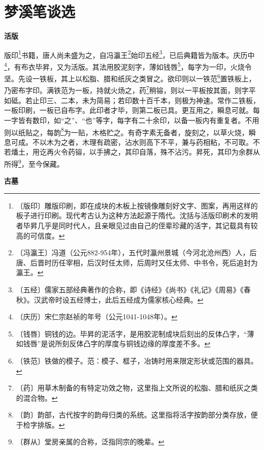 \documentclass[12pt,UTF-8,openany,a4]{ctexbook}
\begin{document}
\chapter{梦溪笔谈选}

\begin{large}
    
    \begin{center}{\Large\textbf{活版}}\end{center}
    
    版印\footnote{〔版印〕\yiwen 雕版印刷，即在成块的木板上按镜像雕刻好文字、图案，再用这样的板子进行印刷。现代考古认为这种方法起源于隋代。沈括与活版印刷术的发明者毕昇几乎是同时代人，且亲眼见过由自己的侄辈珍藏的活字，其记载具有较高的可信度。}书籍，唐人尚未盛为之，自冯瀛王\footnote{〔冯瀛王〕\yiwen 冯道（公元882-954年），五代时瀛州景城（今河北沧州西）人，后唐、后晋时历任宰相，后汉时任太师，后周时又任太师、中书令，死后追封为瀛王。}始印五经\footnote{〔五经〕\yiwen 儒家五部经典著作的合称，即《诗经》《尚书》《礼记》《周易》《春秋》。汉武帝时设五经博士，此后五经成为儒家核心经典。}，已后典籍皆为版本。庆历中\footnote{〔庆历〕\yiwen 宋仁宗赵祯的年号（公元1041-1048年）。}，有布衣毕昇，又为活版。其法用胶泥刻字，薄如钱唇\footnote{〔钱唇〕\yiwen 铜钱的边。毕昇的泥活字，是用胶泥制成块后刻出的反体凸字，“薄如钱唇”是说所刻反体凸字的厚度与铜钱边缘的厚度差不多。}，每字为一印，火烧令坚。先设一铁板，其上以松脂、腊和纸灰之类冒之。欲印则以一铁范\footnote{〔铁范〕\yiwen 铁做的模子。范：模子、框子，冶铸时用来限定形状或范围的器具。}置铁板上，乃密布字印。满铁范为一板，持就火炀之，药\footnote{〔药〕\yiwen 用草木制备的有特定功效之物，这里指上文所说的松脂、腊和纸灰之类的混合物。}稍镕，则以一平板按其面，则字平如砥。若止印三、二本，未为简易；若印数十百千本，则极为神速。常作二铁板，一板印刷，一板已自布字。此印者才毕，则第二板已具。更互用之，瞬息可就。每一字皆有数印，如“之”、“也”等字，每字有二十余印，以备一板内有重复者。不用则以纸贴之，每韵\footnote{〔韵〕\yiwen 韵部，古代按字的韵母归类的系统。这里指将活字按韵部分类存放，便于检字排版。}为一贴，木格贮之。有奇字素无备者，旋刻之，以草火烧，瞬息可成。不以木为之者，木理有疏密，沾水则高下不平，兼与药相粘，不可取。不若燔土，用讫再火令药镕，以手拂之，其印自落，殊不沾污。昇死，其印为余群从所得\footnote{〔群从〕\yiwen 堂房亲属的合称，泛指同宗的晚辈。}，至今保藏。
    
    \begin{center}{\Large\textbf{古墓}}\end{center}
    

\end{large}
\end{document}
